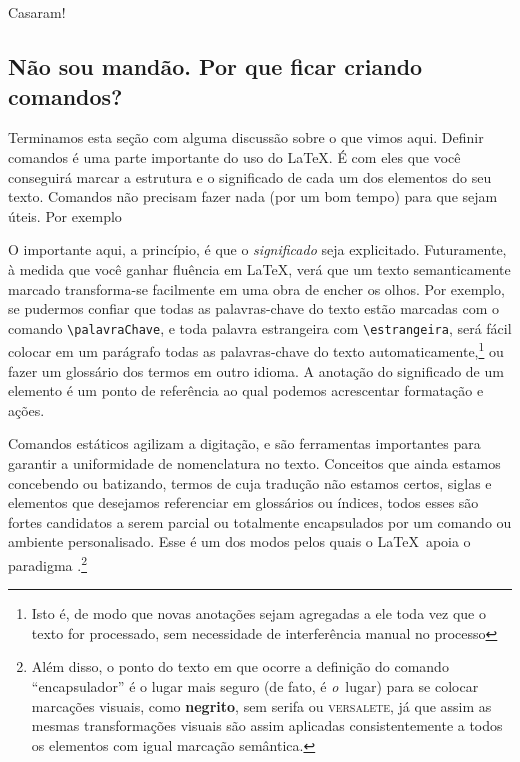 \bigskip
\begin{ttsampleflushleft}%
\\
  \\
    Casaram!\\
\end{ttsampleflushleft}

\subsection[Estender pra quê?]%
{Não sou mandão. Por que ficar criando comandos?}
\label{sec:porque-estender}

Terminamos esta seção com alguma discussão sobre o que vimos
aqui. Definir comandos é uma parte importante do uso do \LaTeX. É com
eles que você conseguirá marcar a estrutura e o significado de cada um
dos elementos do seu texto. Comandos não precisam fazer nada (por um
bom tempo) para que sejam úteis. Por exemplo

\begin{ttsample}
\end{ttsample}

O importante aqui, a princípio, é que o \emph{significado} seja
explicitado. Futuramente, à medida que você ganhar fluência em
\LaTeX, verá que um texto semanticamente marcado transforma-se
facilmente em uma obra de encher os olhos. Por exemplo, se
pudermos confiar que todas as palavras-chave do texto estão marcadas
com o comando \verb'\palavraChave', e toda palavra estrangeira com
\verb'\estrangeira', será fácil colocar em um parágrafo todas as
palavras-chave do texto automaticamente,\negthinspace\footnote{Isto é,
  de modo que novas anotações sejam agregadas a ele toda vez que o
texto for processado, sem necessidade de interferência manual no
processo} ou fazer um glossário dos termos em outro idioma. A
anotação do significado de um elemento é um ponto de referência ao
qual podemos acrescentar formatação e ações.


Comandos estáticos agilizam a digitação, e são ferramentas importantes
para garantir a uniformidade de nomenclatura no texto. 
Conceitos que ainda estamos concebendo ou batizando, termos de cuja
tradução não estamos certos, siglas e  elementos que desejamos
referenciar em glossários ou índices, todos esses são fortes
candidatos a serem parcial ou totalmente encapsulados por um comando
ou ambiente personalisado. Esse é um dos modos pelos quais o
\LaTeX\ apoia o paradigma \acronimowysiwym.\footnote{Além disso, o
  ponto do texto em que ocorre a
  definição do comando ``encapsulador'' é o lugar mais seguro
  (de fato, é \emph{o}~lugar) para se colocar marcações visuais, como
  \textbf{negrito}, \textsf{sem serifa} ou \textsc{versalete}, já que
  assim as mesmas transformações visuais são assim aplicadas
  consistentemente a todos os elementos com igual marcação semântica.}




